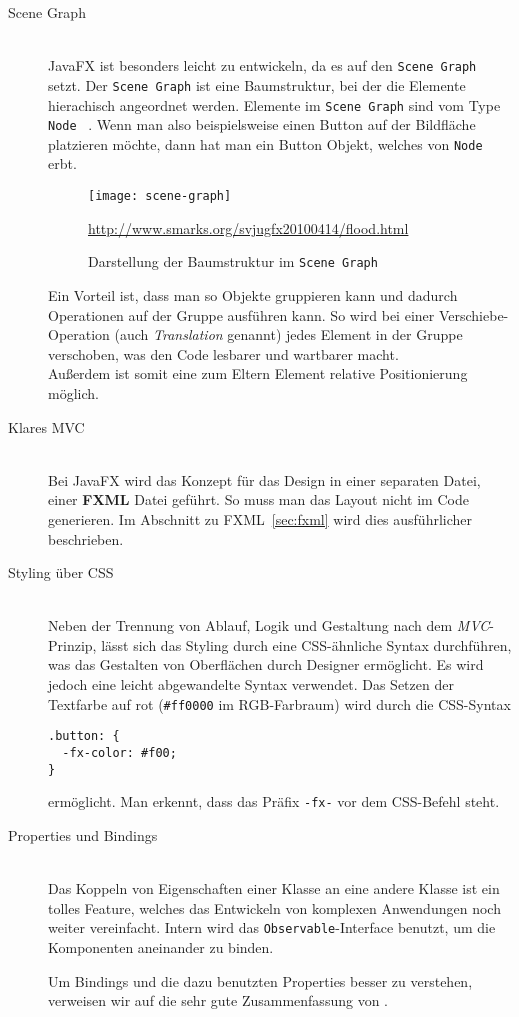 \begin{description}
\item[Scene Graph]\hfill\\
JavaFX ist besonders leicht zu entwickeln, da es auf den \texttt{Scene Graph} setzt. Der \texttt{Scene Graph} ist eine Baumstruktur, bei der die Elemente hierachisch angeordnet werden. Elemente im \texttt{Scene Graph} sind vom Type \texttt{Node} ~\cite{ProJavaFX8}. Wenn man also beispielsweise einen Button auf der Bildfläche platzieren möchte, dann hat man ein Button Objekt, welches von \texttt{Node} erbt.

\begin{figure}[!htb]
    \centering
      \texttt{[image: scene-graph]}
    \caption{Darstellung der Baumstruktur im \texttt{Scene Graph}}{\url{http://www.smarks.org/svjugfx20100414/flood.html}}
    \label{fig:scene-graph}
\end{figure}

Ein Vorteil ist, dass man so Objekte gruppieren kann und dadurch Operationen auf der Gruppe ausführen kann. So wird bei einer Verschiebe-Operation (auch \textit{Translation} genannt) jedes Element in der Gruppe verschoben, was den Code lesbarer und wartbarer macht.\\
Außerdem ist somit eine zum Eltern Element relative Positionierung möglich.

\item[Klares MVC]\hfill\\
Bei JavaFX wird das Konzept für das Design in einer separaten Datei, einer \textbf{FXML} Datei geführt. So muss man das Layout nicht im Code generieren. Im Abschnitt zu FXML~\ref{sec:fxml} wird dies ausführlicher beschrieben.

\item[Styling über CSS]\hfill\\
Neben der Trennung von Ablauf, Logik und Gestaltung nach dem \textit{MVC}-Prinzip, lässt sich das Styling durch eine CSS-ähnliche Syntax durchführen, was das Gestalten von Oberflächen durch Designer ermöglicht. Es wird jedoch eine leicht abgewandelte Syntax verwendet. Das Setzen der Textfarbe auf rot (\texttt{\#ff0000} im RGB-Farbraum) wird durch die CSS-Syntax
\begin{verbatim}
.button: {
  -fx-color: #f00;
}
\end{verbatim}
ermöglicht. Man erkennt, dass das Präfix \texttt{-fx-} vor dem CSS-Befehl steht.

\item[Properties und Bindings]\hfill\\
Das Koppeln von Eigenschaften einer Klasse an eine andere Klasse ist ein tolles Feature, welches das Entwickeln von komplexen Anwendungen noch weiter vereinfacht. Intern wird das \texttt{Observable}-Interface benutzt, um die Komponenten aneinander zu binden.

Um Bindings und die dazu benutzten Properties besser zu verstehen, verweisen wir auf die sehr gute Zusammenfassung von \cite{JavaBeginner-Binding}.
\end{description}

